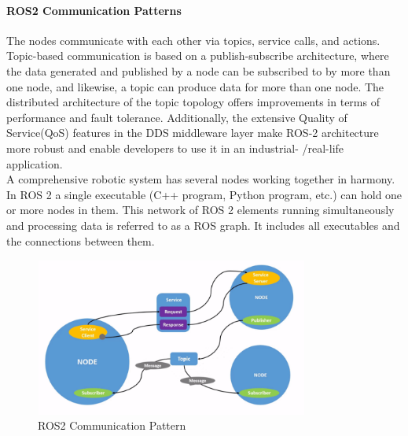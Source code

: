 	\paragraph[ROS2]{ROS2 Communication Patterns}
	\label{Grundlagen:ROS2:CommunicationPatterns}

	The nodes communicate with each other via topics, service calls, and actions. Topic-based communication is based on a publish-subscribe architecture, where the data generated and published by a node can be subscribed to by more than one node, and likewise, a topic can produce data for more than one node. 
	The distributed architecture of the topic topology offers improvements in terms of performance and fault tolerance. Additionally, the extensive Quality of Service(QoS) features in the DDS middleware layer make ROS-2 architecture more robust and enable developers to use it in an industrial- /real-life application.\\

	A comprehensive robotic system has several nodes working together in harmony. In ROS 2 a single executable (C++ program, Python program, etc.) can hold one or more nodes in them. This network of ROS 2 elements running simultaneously and processing data is referred to as a ROS graph. It includes all executables and the connections between them.



	\begin{figure}[H]
		\centering
		\includegraphics[width=0.8\textwidth]{"Bilder/ros-nodes.png"}
		\caption{ROS2 Communication Pattern \cite{ros2Basic}}
		\label{fig:Background:Ros2Nodes}					
	\end{figure}

